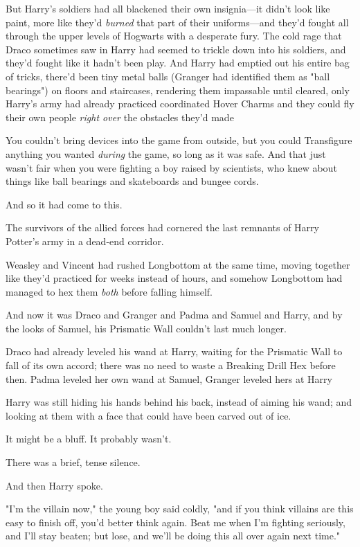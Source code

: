 But Harry's soldiers had all blackened their own insignia---it didn't look like
paint, more like they'd \emph{burned} that part of their uniforms---and they'd
fought all through the upper levels of Hogwarts with a desperate fury. The cold
rage that Draco sometimes saw in Harry had seemed to trickle down into his
soldiers, and they'd fought like it hadn't been play. And Harry had emptied out
his entire bag of tricks, there'd been tiny metal balls (Granger had identified
them as "ball bearings") on floors and staircases, rendering them impassable
until cleared, only Harry's army had already practiced coordinated Hover Charms
and they could fly their own people \emph{right over} the obstacles they'd
made{\el}

You couldn't bring devices into the game from outside, but you could
Transfigure anything you wanted \emph{during} the game, so long as it was safe.
And that just wasn't fair when you were fighting a boy raised by scientists,
who knew about things like ball bearings and skateboards and bungee cords.

And so it had come to this.

The survivors of the allied forces had cornered the last remnants of Harry
Potter's army in a dead-end corridor.

Weasley and Vincent had rushed Longbottom at the same time, moving together
like they'd practiced for weeks instead of hours, and somehow Longbottom had
managed to hex them \emph{both} before falling himself.

And now it was Draco and Granger and Padma and Samuel and Harry, and by the
looks of Samuel, his Prismatic Wall couldn't last much longer.

Draco had already leveled his wand at Harry, waiting for the Prismatic Wall to
fall of its own accord; there was no need to waste a Breaking Drill Hex before
then. Padma leveled her own wand at Samuel, Granger leveled hers at
Harry{\el}

Harry was still hiding his hands behind his back, instead of aiming his wand;
and looking at them with a face that could have been carved out of ice.

It might be a bluff. It probably wasn't.

There was a brief, tense silence.

And then Harry spoke.

"I'm the villain now," the young boy said coldly, "and if you think villains
are this easy to finish off, you'd better think again. Beat me when I'm
fighting seriously, and I'll stay beaten; but lose, and we'll be doing this all
over again next time."

